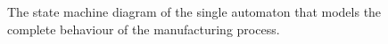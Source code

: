 \begin{sidewaysfigure}
  \begin{figure}[H]\centering
    \scalebox{0.8}{}
    \caption{The state machine diagram of the single automaton that models the
      complete behaviour of the manufacturing process.}
    \label{fig:fsm_2}
  \end{figure}
\end{sidewaysfigure}
